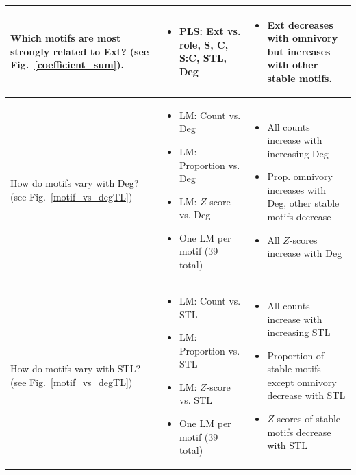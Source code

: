 \documentclass[12pt]{article}
\begin{document}
\begin{landscape}
\begin{table}[h!]
\begin{tabular}{m{6.5cm}|m{7cm}|m{8cm}}
        \hline
        Which motifs are most strongly related to Ext? (see Fig.~\ref{coefficient_sum}). & \begin{itemize}
            \item PLS: Ext vs. role, S, C, S:C, STL, Deg \end{itemize} & \begin{itemize} \item Ext decreases with omnivory but increases with other stable motifs. \end{itemize} \\
        \hline
        How do motifs vary with Deg? \newline(see Fig.~\ref{motif_vs_degTL}) & \begin{itemize} 
        \item LM: Count vs. Deg 
        \item LM: Proportion vs. Deg 
        \item LM: $Z$-score vs. Deg 
        \item One LM per motif (39 total)
        \end{itemize} 
        & 
        \begin{itemize}
            \item All counts increase with increasing Deg
            \item Prop. omnivory increases with Deg, other stable motifs decrease
            \item All $Z$-scores increase with Deg \end{itemize}\\
        How do motifs vary with STL? \newline(see Fig.~\ref{motif_vs_degTL}) & \begin{itemize} 
        \item LM: Count vs. STL 
        \item LM: Proportion vs. STL 
        \item LM: $Z$-score vs. STL
        \item One LM per motif (39 total)
        \end{itemize} &
        \begin{itemize}
            \item All counts increase with increasing STL
            \item Proportion of stable motifs except omnivory decrease with STL
            \item $Z$-scores of stable motifs decrease with STL
        \end{itemize} \\
        \end{tabular}
    \end{table}
\end{landscape}
\end{document}
